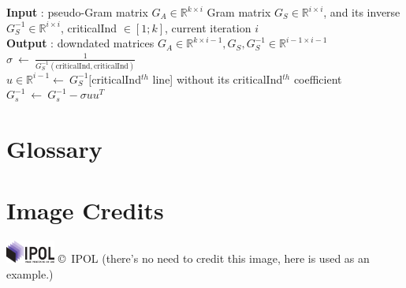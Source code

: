 \documentclass{ipol}
\newcommand{\dsize}{k}
\begin{document}
\begin{algorithm}[H]

\SetLine
\textbf{Input} : pseudo-Gram matrix $G_A \in \mathbb{R}^{\dsize \times i}$
Gram matrix $G_S \in \mathbb{R}^{i \times i}$, and its 
inverse $G_S^{-1}\in \mathbb{R}^{i \times i}$, criticalInd $\in [1; \dsize]$, current iteration $i$\\
\textbf{Output} : downdated matrices $G_A \in \mathbb{R}^{\dsize \times i-1}, G_S, G_S^{-1} \in \mathbb{R}^{i-1 \times i-1}$\\

$\sigma \ \leftarrow \ \frac{1}{G_S^{-1}(\text{criticalInd}, \text{criticalInd})}$\\
$u \in \mathbb{R}^{i-1} \leftarrow \ G_S^{-1} [$criticalInd$^{th}$ line] without its criticalInd$^{th}$ coefficient\\
$G_s^{-1} \ \leftarrow \ G_s^{-1}-\sigma u u^T$\\

\caption{Downdate invert algorithm {\color{red} downdateGram} {\color{blue} Marc: Algo ne correspondant pas, j'ai cr\'e\'e une nouvelle fonction downdateGramBis dont je pense est une meilleure version. Il faudra la tester et la valider.}}

\end{algorithm}

\section*{Glossary}



\section*{Image Credits}

\includegraphics[height=2em]{ipol_logo} \copyright\ IPOL (there's no
need to credit this image, here is used as an example.)
\end{document}
